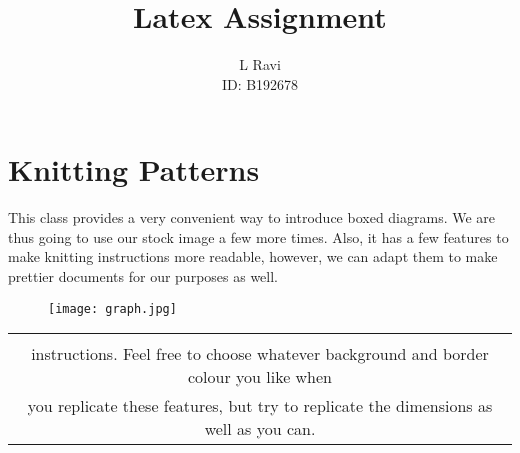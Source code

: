 \usepackage[utf8]{inputenc}
\usepackage{xcolor}
\usepackage{circuitikz}
\usepackage{amsmath}
\usepackage{tikz}
\usepackage{amssymb}
\usetikzlibrary{shapes,arrows,positioning}
\usepackage{graphicx}
\usepackage[table]{xcolor}
\usepackage{tabularx}
\usepackage{wrapfig}
\usepackage{xskak}
\usepackage{chemfig}
\usepackage{modiagram}

\title{\textbf{\huge{Latex Assignment} }}
\author{\large {L Ravi \\ ID: B192678} }
\date{}
\maketitle

\section{Knitting Patterns}
\begin{paragraph} This class provides a very convenient way to introduce boxed diagrams. We are thus going to use our stock image a few more
times. Also, it has a few features to make knitting instructions more readable, however, we can adapt them to make prettier documents for our purposes as well.

\end{paragraph}

\begin{figure}[h]
 \centering
 \texttt{[image: graph.jpg]}
 \end{figure}
 

 \begin{table}[h]
 \centering
 \setlength{\arrayrulewidth}{0.56mm}
 \begin{tabular}{|c|}
     \hline
\rowcolor{yellow!80}{We have a way of highlighting important text, or as was originally intended, important}\\ 
\rowcolor{yellow!80}instructions. Feel free to choose whatever background and border colour you like when \\
\rowcolor{yellow!80}you replicate these features, but try to replicate the dimensions as well as you can.\\
     \hline
 \end{tabular}
 \end{table}
 
